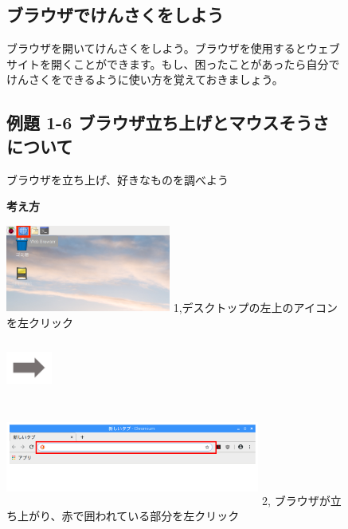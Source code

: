 \documentclass[a4paper,12pt]{jarticle}
\begin{document}
\begin{figure}[t]
  \subsection{ブラウザでけんさくをしよう}
  ブラウザを開いてけんさくをしよう。ブラウザを使用するとウェブサイトを開くことができます。もし、困ったことがあったら自分でけんさくをできるように使い方を覚えておきましょう。

  \subsection{例題 1-6
    ブラウザ立ち上げとマウスそうさについて}
  ブラウザを立ち上げ、好きなものを調べよう

  {\bf\large 考え方}

  \begin{minipage}{\textwidth}
    \begin{minipage}{6.204cm}
      \includegraphics[width=5.426cm,height=2.849cm]{textbook-img071.png}
      1,デスクトップの左上のアイコンを左クリック
    \end{minipage}
    \includegraphics[width=1.505cm,height=1.707cm]{textbook-img073.png}
    \begin{minipage}{8.233cm}
      \includegraphics[width=8.373cm,height=3.193cm]{textbook-img075.png}
      2,
      ブラウザが立ち上がり、赤で囲われている部分を左クリック
    \end{minipage}
  \end{minipage}


\end{figure}
\end{document}
